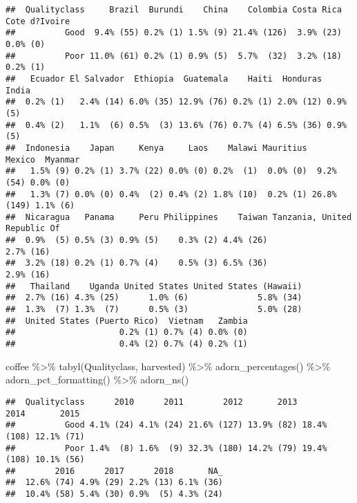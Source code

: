 \documentclass[
]{article}
\newenvironment{Shaded}{\begin{snugshade}}{\end{snugshade}}
\newcommand{\FunctionTok}[1]{\textcolor[rgb]{0.00,0.00,0.00}{#1}}
\newcommand{\NormalTok}[1]{#1}
\newcommand{\SpecialCharTok}[1]{\textcolor[rgb]{0.00,0.00,0.00}{#1}}
\begin{document}
\begin{verbatim}
##  Qualityclass     Brazil  Burundi    China    Colombia Costa Rica Cote d?Ivoire
##          Good  9.4% (55) 0.2% (1) 1.5% (9) 21.4% (126)  3.9% (23)      0.0% (0)
##          Poor 11.0% (61) 0.2% (1) 0.9% (5)  5.7%  (32)  3.2% (18)      0.2% (1)
##   Ecuador El Salvador  Ethiopia  Guatemala    Haiti  Honduras    India
##  0.2% (1)   2.4% (14) 6.0% (35) 12.9% (76) 0.2% (1) 2.0% (12) 0.9% (5)
##  0.4% (2)   1.1%  (6) 0.5%  (3) 13.6% (76) 0.7% (4) 6.5% (36) 0.9% (5)
##  Indonesia    Japan     Kenya     Laos    Malawi Mauritius      Mexico  Myanmar
##   1.5% (9) 0.2% (1) 3.7% (22) 0.0% (0) 0.2%  (1)  0.0% (0)  9.2%  (54) 0.0% (0)
##   1.3% (7) 0.0% (0) 0.4%  (2) 0.4% (2) 1.8% (10)  0.2% (1) 26.8% (149) 1.1% (6)
##  Nicaragua   Panama     Peru Philippines    Taiwan Tanzania, United Republic Of
##  0.9%  (5) 0.5% (3) 0.9% (5)    0.3% (2) 4.4% (26)                    2.7% (16)
##  3.2% (18) 0.2% (1) 0.7% (4)    0.5% (3) 6.5% (36)                    2.9% (16)
##   Thailand    Uganda United States United States (Hawaii)
##  2.7% (16) 4.3% (25)      1.0% (6)              5.8% (34)
##  1.3%  (7) 1.3%  (7)      0.5% (3)              5.0% (28)
##  United States (Puerto Rico)  Vietnam   Zambia
##                     0.2% (1) 0.7% (4) 0.0% (0)
##                     0.4% (2) 0.7% (4) 0.2% (1)
\end{verbatim}

\begin{Shaded}
\begin{Highlighting}[]
\NormalTok{coffee }\SpecialCharTok{\%\textgreater{}\%} 
  \FunctionTok{tabyl}\NormalTok{(Qualityclass, harvested) }\SpecialCharTok{\%\textgreater{}\%} 
  \FunctionTok{adorn\_percentages}\NormalTok{() }\SpecialCharTok{\%\textgreater{}\%} 
  \FunctionTok{adorn\_pct\_formatting}\NormalTok{() }\SpecialCharTok{\%\textgreater{}\%} 
  \FunctionTok{adorn\_ns}\NormalTok{()}
\end{Highlighting}
\end{Shaded}

\begin{verbatim}
##  Qualityclass      2010      2011        2012       2013        2014       2015
##          Good 4.1% (24) 4.1% (24) 21.6% (127) 13.9% (82) 18.4% (108) 12.1% (71)
##          Poor 1.4%  (8) 1.6%  (9) 32.3% (180) 14.2% (79) 19.4% (108) 10.1% (56)
##        2016      2017      2018       NA_
##  12.6% (74) 4.9% (29) 2.2% (13) 6.1% (36)
##  10.4% (58) 5.4% (30) 0.9%  (5) 4.3% (24)
\end{verbatim}
\end{document}
